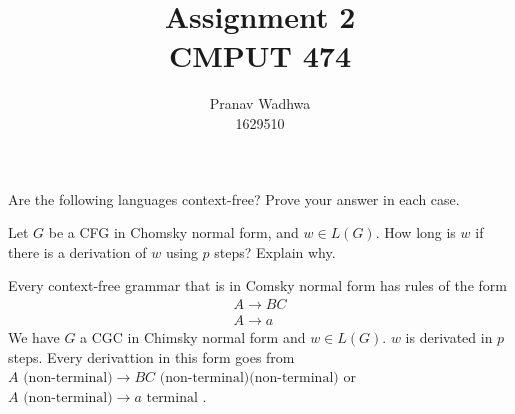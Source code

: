 \documentclass[12pt]{exam}
\title{
  Assignment 2\\
  \large CMPUT 474
}
\author{Pranav Wadhwa\\1629510}
\begin{document}
\maketitle
\noindent

\begin{questions}

  \question{} Are the following languages context-free? Prove your answer in each case.

  \question{} Let $G$ be a CFG in Chomsky normal form, and $w\in L(G)$. How long is $w$ if there is a derivation of $w$ using $p$ steps? Explain why.

  \begin{solution}

    Every context-free grammar that is in Comsky normal form has rules of the form
    \begin{gather*}
      A\to BC\\
      A\to a
    \end{gather*}
    We have $G$ a CGC in Chimsky normal form and $w\in L(G)$. $w$ is derivated in $p$ steps.
    Every derivattion in this form goes from $A\text{ (non-terminal)} \to BC\text{ (non-terminal)(non-terminal)}$ or $A\text{ (non-terminal)}\to a \text{ terminal }$.


\end{solution}
\end{questions}
\end{document}
